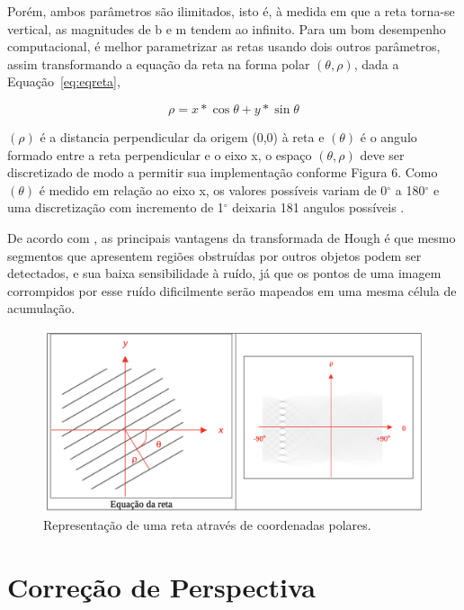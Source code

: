 Porém, ambos parâmetros são ilimitados, isto é, à medida em que a reta torna-se vertical, as magnitudes de b e m tendem ao infinito. Para um bom desempenho computacional, é melhor parametrizar as retas usando dois outros parâmetros, assim transformando a equação da reta na forma polar $(\theta, \rho)$, dada a Equação~\ref{eq:eqreta},

\begin{equation}
\rho = x*\cos{\theta} + y*\sin{\theta}
\label{eq:eqreta}
\end{equation}

$(\rho)$ é a distancia perpendicular da origem (0,0) à reta e $(\theta)$ é o angulo formado entre a reta perpendicular e o eixo x, o espaço $(\theta, \rho)$ deve ser discretizado de modo a permitir sua implementação conforme Figura 6. Como $(\theta)$ é medido em relação ao eixo x, os valores possíveis variam de 0$^{\circ}$ a 180$^{\circ}$ e uma discretização com incremento de 1$^{\circ}$ deixaria 181 angulos possíveis \cite{PEDRINI2008}.

De acordo com , as principais vantagens da transformada de Hough é que mesmo segmentos que apresentem regiões obstruídas por outros objetos podem ser detectados, e sua baixa sensibilidade à ruído, já que os pontos de uma imagem corrompidos por esse ruído dificilmente serão mapeados em uma mesma célula de acumulação.

 \begin{figure}[h]
	\centering
	\includegraphics[width=1.0\textwidth]{Imagens/eqreta} 
	\caption[Representação de uma reta através de coordenadas polares.]{Representação de uma reta através de coordenadas polares.}
	\label{fig:tux_laplace}
\end{figure}


\section{Correção de Perspectiva}

